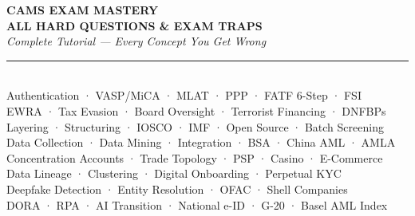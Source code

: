 \documentclass[12pt,aspectratio=169]{beamer}
\begin{document}
	
	\begin{frame}
		\centering
		\vspace{0.5cm}
		{\fontsize{18}{22}\selectfont \textbf{CAMS EXAM MASTERY}}\\[0.15cm]
		{\fontsize{14}{17}\selectfont \textbf{ALL HARD QUESTIONS \& EXAM TRAPS}}\\[0.2cm]
		{\fontsize{9}{11}\selectfont \textit{Complete Tutorial — Every Concept You Get Wrong}}\\[0.1cm]
		\rule{4cm}{0.5pt}\\[0.1cm]
		{\fontsize{7}{9}\selectfont Authentication · VASP/MiCA · MLAT · PPP · FATF 6-Step · FSI}\\[0.05cm]
		{\fontsize{7}{9}\selectfont EWRA · Tax Evasion · Board Oversight · Terrorist Financing · DNFBPs}\\[0.05cm]
		{\fontsize{7}{9}\selectfont Layering · Structuring · IOSCO · IMF · Open Source · Batch Screening}\\[0.05cm]
		{\fontsize{7}{9}\selectfont Data Collection · Data Mining · Integration · BSA · China AML · AMLA}\\[0.05cm]
		{\fontsize{7}{9}\selectfont Concentration Accounts · Trade Topology · PSP · Casino · E-Commerce}\\[0.05cm]
		{\fontsize{7}{9}\selectfont Data Lineage · Clustering · Digital Onboarding · Perpetual KYC}\\[0.05cm]
		{\fontsize{7}{9}\selectfont Deepfake Detection · Entity Resolution · OFAC · Shell Companies}\\[0.05cm]
		{\fontsize{7}{9}\selectfont DORA · RPA · AI Transition · National e-ID · G-20 · Basel AML Index}
		\vspace{0.3cm}
	\end{frame}
	
\end{document}
